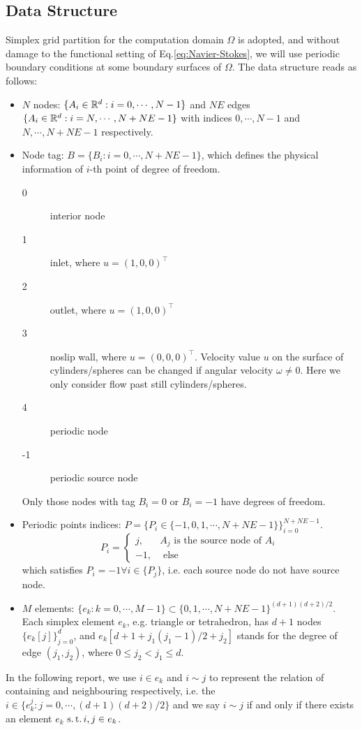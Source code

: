 \subsection{Data Structure}
Simplex grid partition for the computation domain $\Omega$ is adopted, 
and without damage to the functional setting of Eq.\eqref{eq:Navier-Stokes}, 
we will use periodic boundary conditions at some boundary surfaces of $\Omega$.
The data structure reads as follows:
\begin{itemize}
  \item $N$ nodes: $\{A_i\in\mathbb{R}^d:i=0,\cdots,N-1\}$ and 
    $NE$ edges $\{A_i\in\mathbb{R}^d:i=N,\cdots,N+NE-1\}$ 
    with indices $0,\cdots,N-1$ and $N,\cdots,N+NE-1$ respectively.

  \item Node tag: $B=\{B_i:i=0,\cdots,N+NE-1\}$, which defines the physical information of $i$-th point of degree of freedom.
    \begin{description}
      \item[0] interior node
      \item[1] inlet, where $u=(1,0,0)^\top$
      \item[2] outlet, where $u=(1,0,0)^\top$
      \item[3] noslip wall, where $u=(0,0,0)^\top$. 
        Velocity value $u$ on the surface of cylinders/spheres can be changed 
        if angular velocity $\omega\neq0$. Here we only consider flow past still cylinders/spheres.
      \item[4] periodic node
      \item[-1] periodic source node
    \end{description}
    Only those nodes with tag $B_i=0$ or $B_i=-1$ have degrees of freedom.

  \item Periodic points indices: $P=\{P_i\in\{-1,0,1,\cdots,N+NE-1\}\}_{i=0}^{N+NE-1}$.
    \[
      P_i=\left\{\begin{array}{ll}
        j, & A_j \text{ is the source node of } A_i \\
        -1, & \text{ else }
      \end{array}\right.
      \]
    which satisfies $P_i=-1\forall i\in \{P_j\}$, 
    i.e. each source node do not have source node.

  \item $M$ elements: $\{e_k:k=0,\cdots,M-1\}\subset\{0,1,\cdots,N+NE-1\}^{(d+1)(d+2)/2}$. 
    Each simplex element $e_k$, e.g. triangle or tetrahedron, 
    has $d+1$ nodes $\{e_k[j]\}_{j=0}^{d}$, 
    and $e_k[d+1+j_1(j_1-1)/2+j_2]$ stands for the degree of edge $(j_1,j_2)$, 
    where $0\leq j_2<j_1\leq d$.

\end{itemize}
In the following report, we use $i\in e_k$ and $i\sim j$ to represent the 
relation of containing and neighbouring respectively, i.e.
the $i\in\{e_k^j:j=0,\cdots,(d+1)(d+2)/2\}$ and 
we say $i\sim j$ if and only if there exists an element $e_k$ $\operatorname*{s.t.} i,j\in e_k$.

